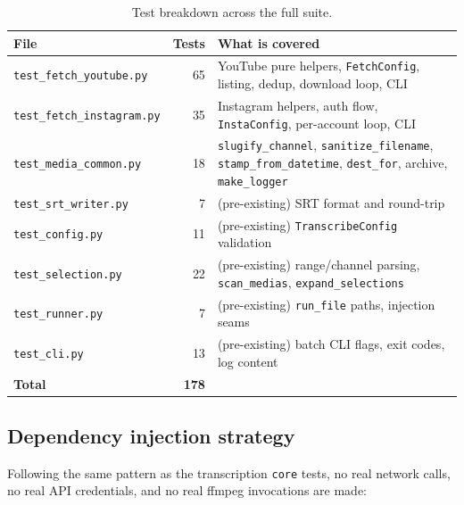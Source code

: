 \documentclass[11pt,a4paper]{report}
\newcommand{\code}[1]{\texttt{\small #1}}
\begin{document}
\begin{table}[ht]
\centering
\small
\renewcommand{\arraystretch}{1.25}
\begin{tabularx}{0.72\textwidth}{@{}l r X@{}}
\toprule
\textbf{File} & \textbf{Tests} & \textbf{What is covered} \\
\midrule
\texttt{test\_fetch\_youtube.py}  & 65 & YouTube pure helpers, \code{FetchConfig}, listing, dedup, download loop, CLI \\
\texttt{test\_fetch\_instagram.py}& 35 & Instagram helpers, auth flow, \code{InstaConfig}, per-account loop, CLI \\
\texttt{test\_media\_common.py}   & 18 & \code{slugify\_channel}, \code{sanitize\_filename}, \code{stamp\_from\_datetime},
                                         \code{dest\_for}, archive, \code{make\_logger} \\
\midrule
\texttt{test\_srt\_writer.py}     &  7 & (pre-existing) SRT format and round-trip \\
\texttt{test\_config.py}          & 11 & (pre-existing) \code{TranscribeConfig} validation \\
\texttt{test\_selection.py}       & 22 & (pre-existing) range/channel parsing, \code{scan\_medias}, \code{expand\_selections} \\
\texttt{test\_runner.py}          &  7 & (pre-existing) \code{run\_file} paths, injection seams \\
\texttt{test\_cli.py}             & 13 & (pre-existing) batch CLI flags, exit codes, log content \\
\midrule
\textbf{Total}                    & \textbf{178} & \\
\bottomrule
\end{tabularx}
\caption{Test breakdown across the full suite.}
\label{tab:tests}
\end{table}

\subsection{Dependency injection strategy}

Following the same pattern as the transcription \texttt{core} tests, no real
network calls, no real API credentials, and no real ffmpeg invocations are made:
\end{document}
